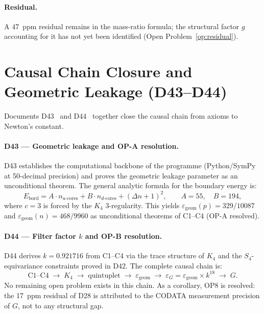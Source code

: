 \documentclass[11pt,a4paper]{article}
\theoremstyle{plain}
\theoremstyle{definition}
\theoremstyle{remark}
\begin{document}
\paragraph{Residual.} A $47$~ppm residual remains in the mass-ratio formula; the structural factor $g$ accounting for it has not yet been identified (Open Problem~\ref{op:residual}).

\section{Causal Chain Closure and Geometric Leakage (D43--D44)}
\label{sec:numerical}

Documents D43~\cite{D43} and D44~\cite{D44} together close the causal chain from axioms to Newton's constant.

\paragraph{D43 --- Geometric leakage and OP-A resolution.} D43 establishes the computational backbone of the programme (Python/SymPy at 50-decimal precision) and proves the geometric leakage parameter as an unconditional theorem. The general analytic formula for the boundary energy is:
\begin{equation}
E_{\mathrm{bord}} = A \cdot n_{u\text{-cores}} + B \cdot n_{d\text{-cores}} + (\Delta n+1)^2, \qquad A = 55,\quad B = 194,
\end{equation}
where $c=3$ is forced by the $K_4$ 3-regularity. This yields $\varepsilon_{\mathrm{geom}}(p) = 329/10087$ and $\varepsilon_{\mathrm{geom}}(n) = 468/9960$ as unconditional theorems of C1--C4 (OP-A resolved).

\paragraph{D44 --- Filter factor $k$ and OP-B resolution.} D44 derives $k = 0.921716$ from C1--C4 via the trace structure of $K_4$ and the $S_4$-equivariance constraints proved in D42. The complete causal chain is:
\begin{equation*}
\text{C1--C4} \;\to\; K_4 \;\to\; \text{quintuplet} \;\to\; \varepsilon_{\mathrm{geom}} \;\to\; \varepsilon_G = \varepsilon_{\mathrm{geom}} \times k^{18} \;\to\; G.
\end{equation*}
No remaining open problem exists in this chain. As a corollary, OP8 is resolved: the 17~ppm residual of D28 is attributed to the CODATA measurement precision of $G$, not to any structural gap.
\end{document}
